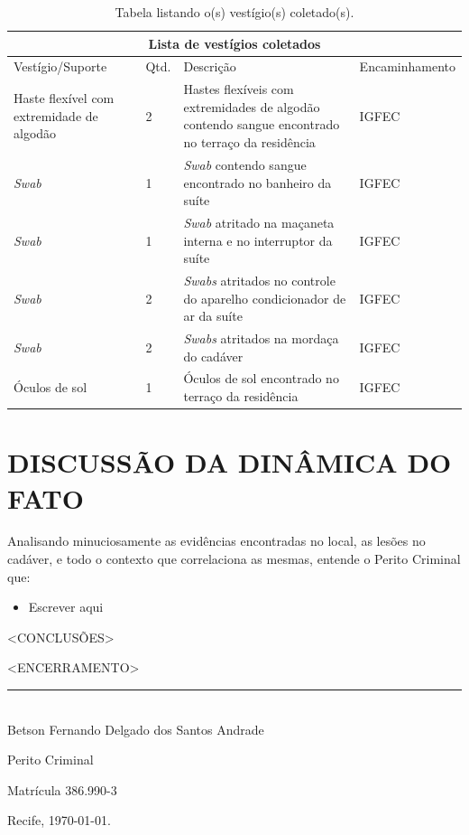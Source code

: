 \documentclass[a4paper,12pt,oneside]{article}
\newcounter{c}
\newcounter{d}
\newcounter{u}
\begin{document}
\vspace{18pt}
\begin{table}[H]
	\centering
	\begin{tabular}{ |p{4cm}|p{0.8cm}|p{6cm}|p{3cm}|  }
		\hline
		\multicolumn{4}{|c|}{\textbf{Lista de vestígios coletados}} \\
		\hline
		Vestígio/Suporte & Qtd. & Descrição & Encaminhamento\\
		\hline
		\hline
		Haste flexível com extremidade de algodão & 2 & Hastes flexíveis com extremidades de algodão contendo sangue encontrado no terraço da residência & IGFEC\\
		\hline
		{\sl Swab} & 1 & {\sl Swab} contendo sangue encontrado no banheiro da suíte & IGFEC\\
		\hline
		{\sl Swab} & 1 & {\sl Swab} atritado na maçaneta interna e no interruptor da suíte & IGFEC\\
		\hline
		{\sl Swab} & 2 & {\sl Swabs} atritados no controle do aparelho condicionador de ar da suíte & IGFEC\\
		\hline
		{\sl Swab} & 2 & {\sl Swabs} atritados na mordaça do cadáver & IGFEC\\
		\hline
		Óculos de sol & 1 & Óculos de sol encontrado no terraço da residência & IGFEC\\
		\hline
		\hline
	\end{tabular}
	\caption{Tabela listando o(s) vestígio(s) coletado(s).}
	\label{encaminhamentos}
\end{table}



\section{DISCUSSÃO DA DINÂMICA DO FATO \label{dinamica}}

Analisando minuciosamente as evidências encontradas no local, as lesões no cadáver, e todo o contexto que correlaciona as mesmas, entende o Perito Criminal que:

\begin{itemize}
	\item Escrever aqui

\end{itemize}

<CONCLUSÕES>

<ENCERRAMENTO>

\centering


\vspace{75pt}
\bf
\rule{300pt}{1.5pt}\\
Betson Fernando Delgado dos Santos Andrade

Perito Criminal

Matrícula 386.990-3
\vspace{36pt} %

\raggedleft Recife, \today.

\label{pagfim}
\end{document}
